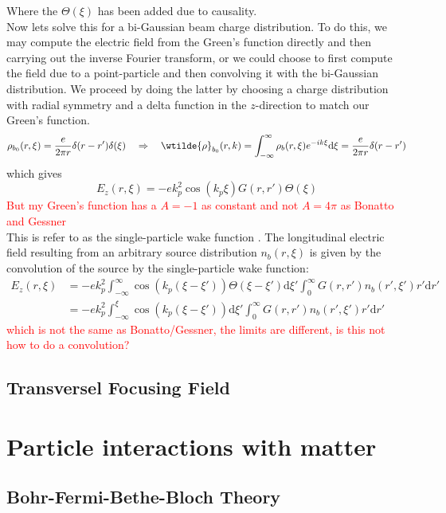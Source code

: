 Where the $\Theta(\xi)$ has been added due to causality.\\
Now lets solve this for a bi-Gaussian beam charge distribution. To do this, we may compute the electric field from the Green's function directly and then carrying out the inverse Fourier transform, or we could choose to first compute the field due to a point-particle and then convolving it with the bi-Gaussian distribution. We proceed by doing the latter by choosing a charge distribution with radial symmetry and a delta function in the $z$-direction to match our Green's function.
\begin{align}
{\rho}_{b_0}(r,\xi)=\frac{e}{2\pi r}\delta(r-r')\delta(\xi) \quad \Rightarrow\quad  \wtilde{\rho}_{b_0}(r,k)=\int_ {-\infty}^{\infty}\rho_b(r,\xi)e^{-ik\xi}\mathrm{d}\xi=\frac{e}{2\pi r}\delta(r-r')
\end{align}
which gives 
\begin{equation}
E_z(r,\xi)=-ek_p^2\cos(k_p\xi)G\left(r,r'\right)\Theta(\xi)
\end{equation}
\textcolor{red}{But my Green's function has a $A=-1$ as constant and not $A=4\pi$ as Bonatto and Gessner}\\
This is refer to as the single-particle wake function \citep{Gessner2016}. The longitudinal electric field resulting from an arbitrary source distribution $n_b(r,\xi)$ is given by the convolution of the source by the single-particle wake function:
\begin{align}
E_z(r,\xi)&=-ek_p^2 \int_{-\infty}^{\infty} \cos(k_p(\xi-\xi'))\Theta(\xi-\xi')\mathrm{d}\xi' \int_{0}^{\infty}G\left(r,r'\right) n_b(r',\xi')r'\mathrm{d}r'\\
&=-ek_p^2 \int_{-\infty}^{\xi} \cos(k_p(\xi-\xi'))\mathrm{d}\xi' \int_{0}^{\infty}G\left(r,r'\right) n_b(r',\xi')r'\mathrm{d}r'
\end{align}
\textcolor{red}{which is not the same as Bonatto/Gessner, the limits are different, is this not how to do a convolution?}
\subsection{Transversel Focusing Field} 

\clearpage
\section{Particle interactions with matter}
\subsection{Bohr-Fermi-Bethe-Bloch Theory}

